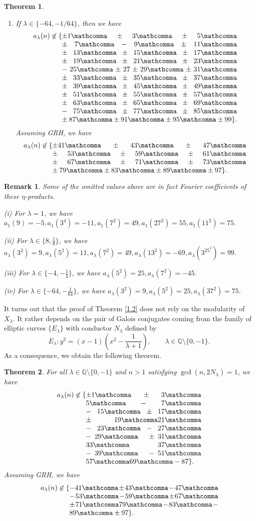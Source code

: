 \documentclass[12pt]{amsart}
\newtheorem{thm}{Theorem}[section]
\newtheorem*{rmk}{Remark}
\newcommand{\Q}{\mathbb{Q}}
\newcommand{\numberlist}[2][0.8\linewidth]{%
  \{\parbox[t]{#1}{\printcommalist{#2}}%
  }
\newcommand{\printcommalist}[1]{%
  \begingroup\lccode`~=`,\lowercase{\endgroup\def~}{\mathcomma\penalty0 }%
  \mathcode`,="8000
  \thinmuskip=6mu plus 6mu minus 2mu
  $#1\}.$
}
\numberwithin{equation}{section}
\begin{document}
\begin{thm}
\begin{enumerate}
    
    \item If $\lambda\in \{-64, -1/64\}$, then we have
    \begin{align*}
a_\lambda(n)\not \in \numberlist[.73\linewidth]{\pm 1,\pm 3,\pm5, \pm7,-9, \pm11, \pm 13,\pm15, \pm 17, \pm 19, \pm21,\pm 23,-25,\pm27 \pm29, \pm 31,\pm33,\pm35,
\pm37,\pm39,\pm 45,\pm49,\pm51,\pm55,\pm57,\pm63,\pm65,\pm69,-75,\pm77,\pm85,\pm87,\pm91 ,\pm95,\pm99}
\end{align*}
Assuming \textit{GRH}, we have 
\begin{align*}
    a_\lambda(n)\not \in \numberlist[.81\linewidth]{\pm41, \pm 43, \pm47, \pm 53, \pm59, \pm61, \pm 67, \pm 71, \pm 73, \pm79, \pm83, \pm89, \pm 97}
\end{align*}    
\end{enumerate}
\end{thm}


\begin{rmk}
Some of the omitted values above are in fact Fourier coefficients of these $\eta$-products.

\noindent
(i) For $\lambda=1$, we have $a_1(9)=-5,a_1(3^4)=-11,a_1(7^2)=49,a_1(27^2)=55,a_1(11^2)=75$. 

\smallskip
\noindent
(ii) For $\lambda\in \{8, \frac{1}{8}\}$, we have $a_\lambda(3^2)=9,a_\lambda(5^2)=11,a_\lambda(7^2)=49,a_\lambda(13^2)=-69,a_\lambda(3^25^2)=99$.

\smallskip
\noindent
(iii) For $\lambda\in \{-4,-\frac{1}{4}\}$, we have $a_\lambda(5^2)=25,a_\lambda(7^2)=-45$.

\smallskip
\noindent
(iv) For $\lambda\in \{-64,-\frac{1}{64}\}$, we have $a_\lambda(3^2)=9,a_\lambda(5^2)=25,a_\lambda(37^2)=75$. 
\end{rmk}
It turns out that the proof of Theorem \ref{1.2} does not rely on the modularity of $X_\lambda$. It rather depends on the pair of Galois conjugates coming from the family of elliptic curves $\{E_\lambda\}$ with conductor $N_\lambda$ defined by
\begin{equation}\label{EC}
    E_\lambda: y^2=\left(x-1\right)\left(x^2-\frac{1}{\lambda+1}\right),\qquad \lambda\in \Q\setminus\{0, -1\}.
\end{equation}
As a consequence, we obtain the following theorem. 
\begin{thm}\label{1.3}
For all $\lambda \in \Q\setminus\{0,-1\}$ and $n> 1$ satisfying $\gcd(n, 2N_\lambda)=1$, we have 
\begin{align*}
a_\lambda(n)\not \in \numberlist[0.48\linewidth]{\pm 1,\pm 3, 5, -7,-15, \pm 17, \pm 19,21, -23, -27, -29,\, \pm 31, \,33, \,37,\,-39,\,-51, 57, 69,-87}
\end{align*}
Assuming \textit{GRH}, we have 
\begin{align*}
    a_\lambda(n)\not \in \numberlist[.62\linewidth]{-41, \pm 43, -47, -53, -59, \pm 67, \pm 71, 79, -83, -89, \pm 97}
\end{align*}    
\end{thm}
\end{document}
